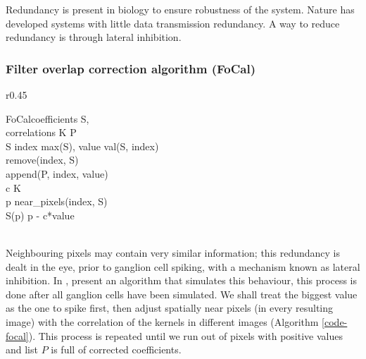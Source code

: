 Redundancy is present in biology to ensure robustness of the
system. Nature has developed systems with little data transmission
redundancy. A way to reduce redundancy is through lateral 
inhibition.
\subsubsection{Filter overlap correction algorithm (FoCal)}
\begin{wrapfigure}{r}{0.45\textwidth}
    \vspace{-26pt}
    \begin{minipage}{0.4\textwidth}
        \begin{pseudocode}{FoCal}{coefficients \; S,\\ 
                                  \hspace*{40mm} correlations\; K}
            \label{code-focal}
            P \GETS \emptyset \\
            \WHILE S \neq \emptyset \DO index \GETS max(S), \; value \GETS val(S, index)\\
            \hspace{0.7cm} remove(index, S)\\
            \hspace{0.7cm} append(P, index, value)\\
            \hspace{0.7cm} \FOREACH c \in K \\
            \hspace{1.4cm} \FOREACH p \in near\_pixels(index, S) \\
            \hspace{2.1cm}   S(p) \GETS p \; - \; c*value\\
            \\
        \end{pseudocode}
            \vspace{-26pt}
    \end{minipage}
\end{wrapfigure}

Neighbouring pixels may contain very similar information;
this redundancy is dealt in the eye, prior to ganglion 
cell spiking, with a mechanism known
as lateral inhibition. In \cite{basab-model},
\citeauthor{basab-model} present an algorithm that
simulates this behaviour, this 
process is done after all ganglion cells have been simulated. 
We shall treat the biggest value as the one to spike first,
then adjust spatially near pixels (in every resulting image)
with the correlation of the kernels in different images 
(Algorithm \ref{code-focal}).
This process is repeated until we run out of pixels with 
positive values and list $P$ is full of corrected coefficients.

